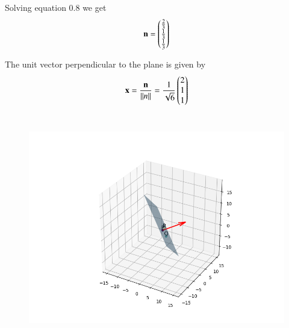\documentclass[journal]{IEEEtran}
\begin{document}
Solving equation 0.8 we get
\begin{align}
    \mathbf{n}=\begin{pmatrix}\frac{2}{3}\\\frac{1}{3}\\\frac{1}{3}\end{pmatrix}
\end{align}


The unit vector perpendicular to the plane is given by \\
\begin{align}
     \mathbf{x}= \frac{\mathbf{n}}{||n||} =   \frac{1}{\sqrt{6}}\begin{pmatrix}2\\1\\1\end{pmatrix}
\end{align}
\\

\begin{figure}[H]
    \centering
    \includegraphics[width=0.8\columnwidth]{figs/fig.png}
    \label{fig-1}
\end{figure}

 
\end{document}
